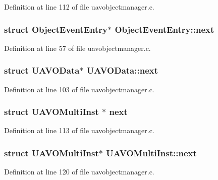 Definition at line 112 of file uavobjectmanager.\-c.

\hypertarget{group___u_a_v_gaf10cb19d61193416975d2cb2c78bf620}{
\subsubsection[{next}]{\setlength{\rightskip}{0pt plus 5cm}struct {\bf Object\-Event\-Entry}$\ast$ Object\-Event\-Entry\-::next}}\label{group___u_a_v_gaf10cb19d61193416975d2cb2c78bf620}


Definition at line 57 of file uavobjectmanager.\-c.

\hypertarget{group___u_a_v_ga69aa4b26e0e8727f2e9a418f42d056a0}{
\subsubsection[{next}]{\setlength{\rightskip}{0pt plus 5cm}struct {\bf U\-A\-V\-O\-Data}$\ast$ U\-A\-V\-O\-Data\-::next}}\label{group___u_a_v_ga69aa4b26e0e8727f2e9a418f42d056a0}


Definition at line 103 of file uavobjectmanager.\-c.

\hypertarget{group___u_a_v_ga0463912be4bb882cee5d3d70c664b698}{
\subsubsection[{next}]{\setlength{\rightskip}{0pt plus 5cm}struct {\bf U\-A\-V\-O\-Multi\-Inst} $\ast$ next}}\label{group___u_a_v_ga0463912be4bb882cee5d3d70c664b698}


Definition at line 113 of file uavobjectmanager.\-c.

\hypertarget{group___u_a_v_ga571693c984fd7e8e845fe57fca2d21d9}{
\subsubsection[{next}]{\setlength{\rightskip}{0pt plus 5cm}struct {\bf U\-A\-V\-O\-Multi\-Inst}$\ast$ U\-A\-V\-O\-Multi\-Inst\-::next}}\label{group___u_a_v_ga571693c984fd7e8e845fe57fca2d21d9}


Definition at line 120 of file uavobjectmanager.\-c.

